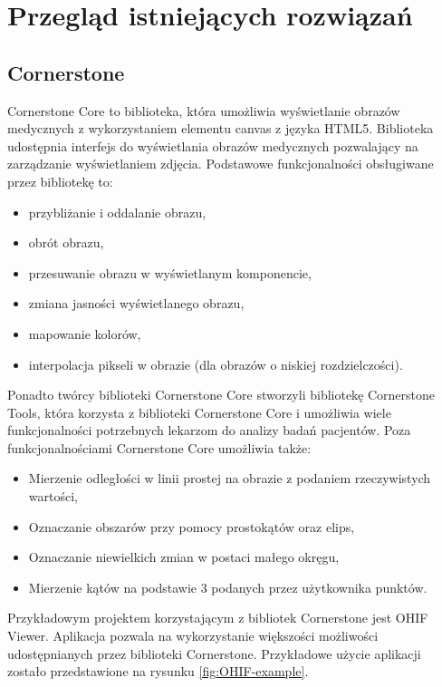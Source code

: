 \documentclass[a4paper,11pt,twoside,openright]{report}
\theoremstyle{definition}
\begin{document}
\section {Przegląd istniejących rozwiązań}

\subsection {Cornerstone}

Cornerstone Core \cite{Cornerstone Core} to biblioteka, która umożliwia wyświetlanie obrazów medycznych z wykorzystaniem elementu canvas z języka HTML5. Biblioteka udostępnia interfejs do wyświetlania obrazów medycznych pozwalający na zarządzanie wyświetlaniem zdjęcia. Podstawowe funkcjonalności obsługiwane przez bibliotekę to:

\begin{itemize}[noitemsep]
\item przybliżanie i oddalanie obrazu,
\item obrót obrazu,
\item przesuwanie obrazu w wyświetlanym komponencie,
\item zmiana jasności wyświetlanego obrazu,
\item mapowanie kolorów,
\item interpolacja pikseli w obrazie (dla obrazów o niskiej rozdzielczości).
\end{itemize}

Ponadto twórcy biblioteki Cornerstone Core stworzyli bibliotekę Cornerstone Tools, która korzysta z biblioteki Cornerstone Core i umożliwia wiele funkcjonalności potrzebnych lekarzom do analizy badań pacjentów. Poza funkcjonalnościami Cornerstone Core umożliwia także:

\begin{itemize}[noitemsep]
\item Mierzenie odległości w linii prostej na obrazie z podaniem rzeczywistych wartości,
\item Oznaczanie obszarów przy pomocy prostokątów oraz elips,
\item Oznaczanie niewielkich zmian w postaci małego okręgu,
\item Mierzenie kątów na podstawie 3 podanych przez użytkownika punktów.
\end{itemize}

Przykładowym projektem korzystającym z bibliotek Cornerstone jest OHIF Viewer. Aplikacja pozwala na wykorzystanie większości możliwości udostępnianych przez biblioteki Cornerstone. Przykładowe użycie aplikacji zostało przedstawione na rysunku \ref{fig:OHIF-example}.
\end{document}
